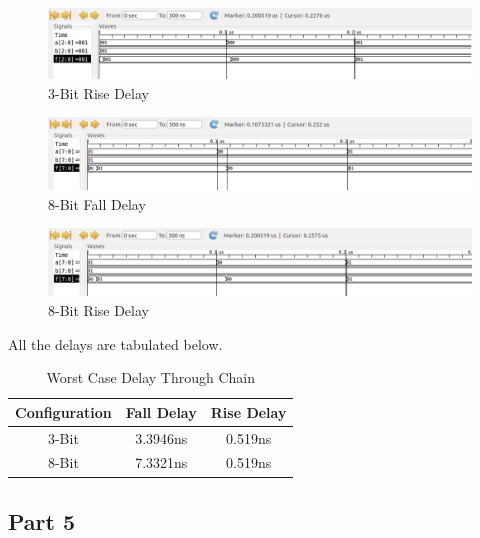 \documentclass{article}
\begin{document}
\begin{figure}[H]
    \centering
    \includegraphics[width=\linewidth]{../part_4/fun_3_rise.png}
    \caption{3-Bit Rise Delay}
\end{figure}

\begin{figure}[H]
    \centering
    \includegraphics[width=\linewidth]{../part_4/fun_8_fall.png}
    \caption{8-Bit Fall Delay}
\end{figure}

\begin{figure}[H]
    \centering
    \includegraphics[width=\linewidth]{../part_4/fun_8_rise.png}
    \caption{8-Bit Rise Delay}
\end{figure}

\vspace{0.25in}
All the delays are tabulated below.

\begin{table}[H]
    \centering
    \begin{tabular}{ccc}
        \toprule
        \textbf{Configuration} & \textbf{Fall Delay} & \textbf{Rise Delay}\\
        \midrule
        3-Bit & 3.3946ns & 0.519ns \\
        8-Bit & 7.3321ns & 0.519ns \\
        \bottomrule
    \end{tabular}
    \caption{Worst Case Delay Through Chain}
\end{table}

\newpage
\subsection*{Part 5}
\end{document}
